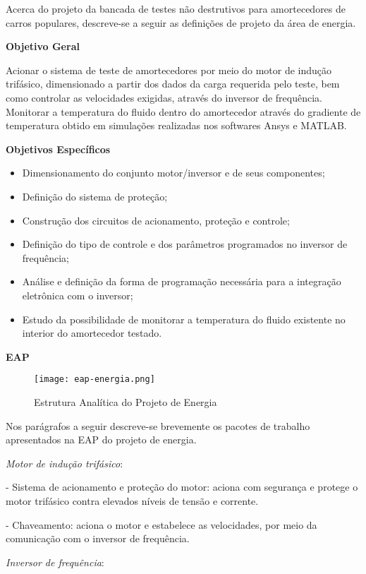 	Acerca do projeto da bancada de testes não destrutivos para amortecedores de carros populares, descreve-se a seguir as definições de projeto da área de energia.

	\textbf{Objetivo Geral}

	Acionar o sistema de teste de amortecedores por meio do motor de indução trifásico, dimensionado a partir dos dados da carga requerida pelo teste, bem como controlar as velocidades exigidas, através do inversor de frequência. Monitorar a temperatura do fluido dentro do amortecedor através do gradiente de temperatura obtido em simulações realizadas nos softwares Ansys e MATLAB.

	\textbf{Objetivos Específicos}

	\begin{itemize}
		\item Dimensionamento do conjunto motor/inversor e de seus componentes;
		\item Definição do sistema de proteção;
		\item Construção dos circuitos de acionamento, proteção e controle;
		\item Definição do tipo de controle e dos parâmetros programados no inversor de frequência;
		\item Análise e definição da forma de programação necessária para a integração eletrônica com o inversor;
		\item Estudo da possibilidade de monitorar a temperatura do fluido existente no interior do amortecedor testado.
	\end{itemize}

	\textbf{EAP}

	\begin{figure}[!h]
		\centering
		\texttt{[image: eap-energia.png]}
		\caption{Estrutura Analítica do Projeto de Energia}
		\label{eap-energia}
	\end{figure}

	Nos parágrafos a seguir descreve-se brevemente os pacotes de trabalho apresentados na EAP do projeto de energia. 

	\textit{Motor de indução trifásico}:


	- Sistema de acionamento e proteção do motor: aciona com segurança e protege o motor trifásico contra elevados níveis de tensão e corrente.

	- Chaveamento: aciona o motor e estabelece as velocidades, por meio da comunicação com o inversor de frequência.

	\textit{Inversor de frequência}:

